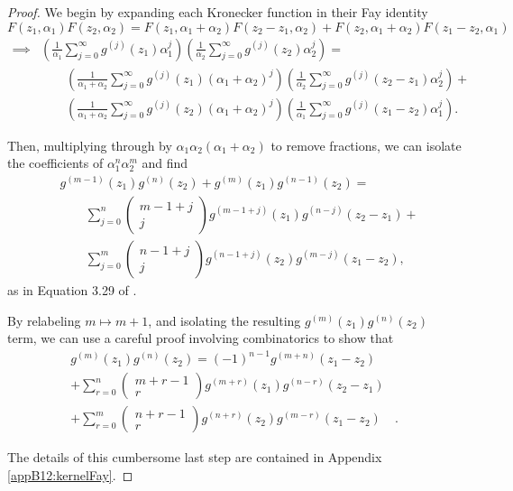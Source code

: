 \begin{proof}
    We begin by expanding each Kronecker function in their Fay identity
    \begin{equation}
        {F}(z_1,\alpha_1){F}(z_2,\alpha_2) = {F}(z_1,\alpha_1+\alpha_2){F}(z_2-z_1,\alpha_2) + {F}(z_2,\alpha_1+\alpha_2){F}(z_1-z_2,\alpha_1)
    \end{equation}
    \begin{align}
        \implies & \left(\frac{1}{\alpha_1} \sum_{j=0}^{\infty} g^{(j)}(z_1) \alpha_1^j\right)
        \left(\frac{1}{\alpha_2} \sum_{j=0}^{\infty} g^{(j)}(z_2) \alpha_2^j\right) =
        \\ & \quad \quad \left(\frac{1}{\alpha_1+\alpha_2} \sum_{j=0}^{\infty} g^{(j)}(z_1) (\alpha_1+\alpha_2)^j\right)
        \left(\frac{1}{\alpha_2} \sum_{j=0}^{\infty} g^{(j)}(z_2-z_1) \alpha_2^j\right) +
        \\ & \quad \quad \left(\frac{1}{\alpha_1+\alpha_2} \sum_{j=0}^{\infty} g^{(j)}(z_2) (\alpha_1+\alpha_2)^j\right)
        \left(\frac{1}{\alpha_1} \sum_{j=0}^{\infty} g^{(j)}(z_1-z_2) \alpha_1^j\right).
    \end{align}

    Then, multiplying through by $\alpha_1\alpha_2(\alpha_1+\alpha_2)$ to remove fractions, we can isolate the coefficients of $\alpha_1^n \alpha_2^m$ and find
    \begin{align}\label{eqnB12:kernelFaySTART}
        & g^{(m-1)}(z_1)g^{(n)}(z_2)+g^{(m)}(z_1)g^{(n-1)}(z_2) =
        \\ & \quad \quad \sum_{j=0}^{n} \begin{pmatrix} m-1+j \\ j \end{pmatrix} g^{(m-1+j)}(z_1) g^{(n-j)}(z_2-z_1) +
        \\ & \quad \quad \sum_{j=0}^{m} \begin{pmatrix} n-1+j \\ j \end{pmatrix} g^{(n-1+j)}(z_2) g^{(m-j)}(z_1-z_2),
    \end{align}
    as in Equation 3.29 of \cite{Broedel_2015}.

    By relabeling $m \mapsto m+1$, and isolating the resulting $g^{(m)}(z_1)g^{(n)}(z_2)$ term, we can use a careful proof involving combinatorics to show that
    \begin{align}\label{eqnB12:kernelFayEND}
        g^{(m)}(z_1) g^{(n)}(z_2) = (-1)^{n-1} g^{(m+n)}(z_1-z_2) &   \\
         +\sum_{r=0}^n \begin{pmatrix} m+r-1 \\ r \end{pmatrix} g^{(m+r)}(z_1) g^{(n-r)}(z_2-z_1) & \\
         +\sum_{r=0}^m \begin{pmatrix} n+r-1 \\ r \end{pmatrix} g^{(n+r)}(z_2) g^{(m-r)}(z_1-z_2) & .
    \end{align}

    The details of this cumbersome last step are contained in Appendix \ref{appB12:kernelFay}.
\end{proof}

